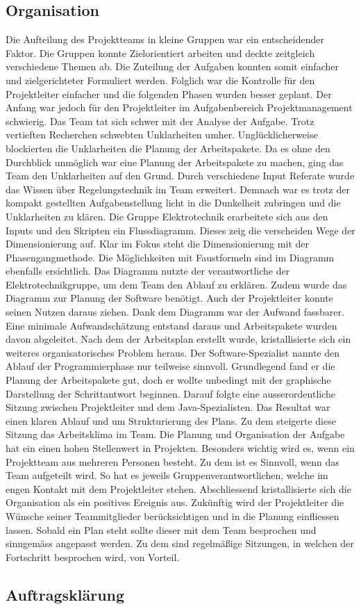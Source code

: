 \subsection{Organisation}
Die Aufteilung des Projektteams in kleine Gruppen war ein entscheidender Faktor. Die Gruppen konnte Zielorientiert arbeiten und deckte zeitgleich verschiedene Themen ab. Die Zuteilung der Aufgaben konnten somit einfacher und zielgerichteter Formuliert werden. Folglich war die Kontrolle für den Projektleiter einfacher und die folgenden Phasen wurden besser geplant. 
Der Anfang war jedoch für den Projektleiter im Aufgabenbereich Projektmanagement schwierig. Das Team tat sich schwer mit der Analyse der Aufgabe. Trotz vertieften Recherchen schwebten Unklarheiten umher. Unglücklicherweise blockierten die Unklarheiten die Planung der Arbeitspakete. Da es ohne den Durchblick unmöglich war eine Planung der Arbeitspakete zu machen, ging das Team den Unklarheiten auf den Grund. Durch verschiedene Input Referate wurde das Wissen  über Regelungstechnik im Team erweitert. Demnach war es trotz der kompakt gestellten Aufgabenstellung licht in die Dunkelheit zubringen und die Unklarheiten zu klären. Die Gruppe Elektrotechnik erarbeitete sich aus den Inputs und den Skripten ein Flussdiagramm. Dieses zeig die verscheiden Wege der Dimensionierung auf. Klar im Fokus steht die Dimensionierung mit der Phasengangmethode. Die Möglichkeiten mit Faustformeln sind im Diagramm ebenfalls ersichtlich. Das Diagramm nutzte der verantwortliche der Elektrotechnikgruppe, um dem Team den Ablauf zu erklären. Zudem wurde das Diagramm zur Planung der Software benötigt. Auch der Projektleiter konnte seinen Nutzen daraus ziehen. Dank dem Diagramm war der Aufwand fassbarer. Eine minimale Aufwandschätzung entstand daraus und Arbeitspakete wurden davon abgeleitet. Nach dem der Arbeitsplan erstellt wurde, kristallisierte sich ein weiteres organisatorisches Problem heraus. Der Software-Spezialist nannte den Ablauf der Programmierphase nur teilweise sinnvoll. Grundlegend fand er die Planung der Arbeitspakete gut, doch er wollte unbedingt mit der graphische Darstellung der Schrittantwort beginnen. Darauf folgte eine ausserordentliche Sitzung zwischen Projektleiter und dem Java-Spezialisten. Das Resultat war einen klaren Ablauf und um Strukturierung des Plans. Zu dem steigerte diese Sitzung das Arbeitsklima im Team. 
Die Planung und Organisation der Aufgabe hat ein einen hohen Stellenwert in Projekten. Besonders wichtig wird es, wenn ein Projektteam aus mehreren Personen besteht. Zu dem ist es Sinnvoll, wenn das Team aufgeteilt wird. So hat es jeweils Gruppenverantwortlichen, welche im engen Kontakt mit dem Projektleiter stehen. Abschliessend kristallisierte sich die Organisation als ein positives Ereignis aus. 
Zukünftig wird der Projektleiter die Wünsche seiner Teammitglieder berücksichtigen und in die Planung einfliessen lassen. Sobald ein Plan steht sollte dieser mit dem Team besprochen und sinngemäss angepasst werden. Zu dem sind regelmäßige Sitzungen, in welchen der Fortschritt besprochen wird, von Vorteil.
\subsection{Auftragsklärung}
